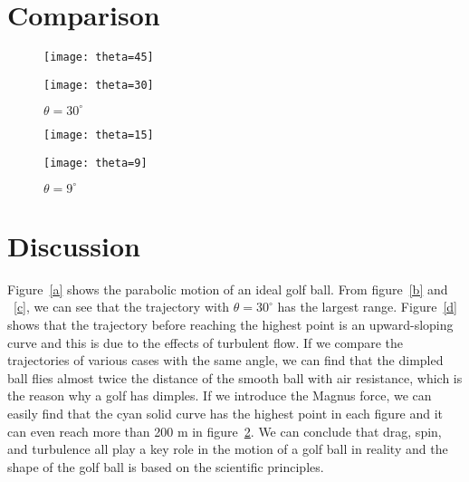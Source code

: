 \documentclass[a4paper]{article}
\begin{document}
	\newpage
	\section{Comparison}	
	\begin{figure}[H]
		\centering
		\texttt{[image: theta=45]}
		\caption{$\theta = 45^{\circ}$}
		\label{e}
		\texttt{[image: theta=30]}
		\caption{$\theta = 30^{\circ}$}
		\label{f}
	\end{figure}
	\newpage
	\begin{figure}[H]
		\centering
		\texttt{[image: theta=15]}
		\caption{$\theta = 15^{\circ}$}
		\label{g}
		\texttt{[image: theta=9]}
		\caption{$\theta = 9^{\circ}$}
		\label{h}
	\end{figure}	
	\newpage
	
	\section{Discussion}
	Figure~\ref{a} shows the parabolic motion of an ideal golf ball. From figure~\ref{b} and ~\ref{c}, we can see that the trajectory with $\theta = 30^{\circ}$ has the largest range. Figure~\ref{d} shows that the trajectory before reaching the highest point is an upward-sloping curve and this is due to the effects of turbulent flow. If we compare the trajectories of various cases with the same angle, we can find that the dimpled ball flies almost twice the distance of the smooth ball with air resistance, which is the reason why a golf has dimples. If we introduce the Magnus force, we can easily find that the cyan solid curve has the highest point in each figure and it can even reach more than 200 m in figure~\ref{h}. We can conclude that drag, spin, and turbulence all play a key role in the motion of a golf ball in reality and the shape of the golf ball is based on the scientific principles.
\end{document}
